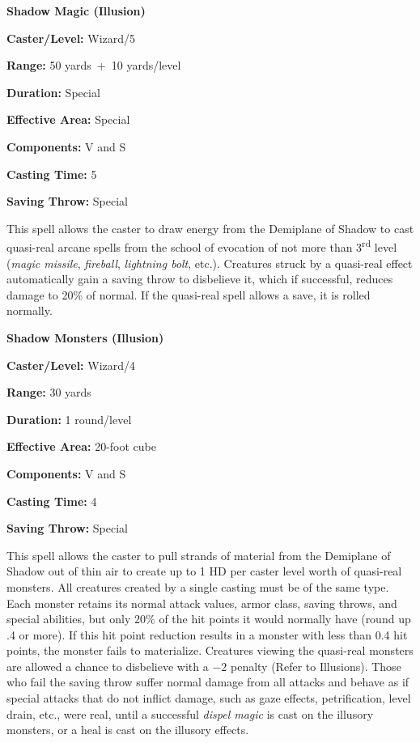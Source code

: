 \begin{multicols}{2}
\begin{minipage}{\columnwidth}
\noindent \textbf{Shadow Magic (Illusion)}

\noindent \textbf{Caster/Level:} Wizard/5

\noindent \textbf{Range:} 50 yards~+~10 yards/level

\noindent \textbf{Duration:} Special

\noindent \textbf{Effective Area:} Special

\noindent \textbf{Components:} V and S

\noindent \textbf{Casting Time:} 5

\noindent \textbf{Saving Throw:} Special

\end{minipage}

This spell allows the caster to draw energy from the Demiplane of Shadow to cast quasi-real arcane spells from the school of evocation of not more than 3\textsuperscript{rd} level (\textit{magic missile}, \textit{fireball}, \textit{lightning bolt}, etc.).  Creatures struck by a quasi-real effect automatically gain a saving throw to disbelieve it, which if successful, reduces damage to 20\% of normal.  If the quasi-real spell allows a save, it is rolled normally.

\vspace{1em}

\noindent
\begin{minipage}{\columnwidth}

\noindent \textbf{Shadow Monsters (Illusion)}

\noindent \textbf{Caster/Level:} Wizard/4

\noindent \textbf{Range:} 30 yards

\noindent \textbf{Duration:} 1 round/level

\noindent \textbf{Effective Area:} 20-foot cube

\noindent \textbf{Components:} V and S

\noindent \textbf{Casting Time:} 4

\noindent \textbf{Saving Throw:} Special

\end{minipage}

This spell allows the caster to pull strands of material from the Demiplane of Shadow out of thin air to create up to 1 HD per caster level worth of quasi-real monsters.  All creatures created by a single casting must be of the same type.  Each monster retains its normal attack values, armor class, saving throws, and special abilities, but only 20\% of the hit points it would normally have (round up .4 or more).  If this hit point reduction results in a monster with less than 0.4 hit points, the monster fails to materialize.  Creatures viewing the quasi-real monsters are allowed a chance to disbelieve with a $-2$ penalty (Refer to Illusions).  Those who fail the saving throw suffer normal damage from all attacks and behave as if special attacks that do not inflict damage, such as gaze effects, petrification, level drain, etc., were real, until a successful \textit{dispel magic} is cast on the illusory monsters, or a heal is cast on the illusory effects.  


\end{multicols}
